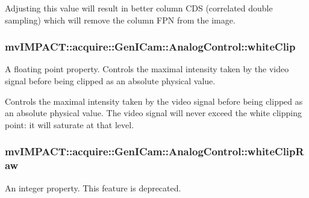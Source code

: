 Adjusting this value will result in better column C\+D\+S (correlated double sampling) which will remove the column F\+P\+N from the image. \hypertarget{classmv_i_m_p_a_c_t_1_1acquire_1_1_gen_i_cam_1_1_analog_control_ac68d98eb5f08c7890fa0012adf778074}{
\subsubsection[{white\+Clip}]{ mv\+I\+M\+P\+A\+C\+T\+::acquire\+::\+Gen\+I\+Cam\+::\+Analog\+Control\+::white\+Clip}}\label{classmv_i_m_p_a_c_t_1_1acquire_1_1_gen_i_cam_1_1_analog_control_ac68d98eb5f08c7890fa0012adf778074}


A floating point property. Controls the maximal intensity taken by the video signal before being clipped as an absolute physical value. 

Controls the maximal intensity taken by the video signal before being clipped as an absolute physical value. The video signal will never exceed the white clipping point\+: it will saturate at that level. \hypertarget{classmv_i_m_p_a_c_t_1_1acquire_1_1_gen_i_cam_1_1_analog_control_a13f11756bb1316dd7b7e518898767527}{
\subsubsection[{white\+Clip\+Raw}]{ mv\+I\+M\+P\+A\+C\+T\+::acquire\+::\+Gen\+I\+Cam\+::\+Analog\+Control\+::white\+Clip\+Raw}}\label{classmv_i_m_p_a_c_t_1_1acquire_1_1_gen_i_cam_1_1_analog_control_a13f11756bb1316dd7b7e518898767527}


An integer property. This feature is deprecated. 

